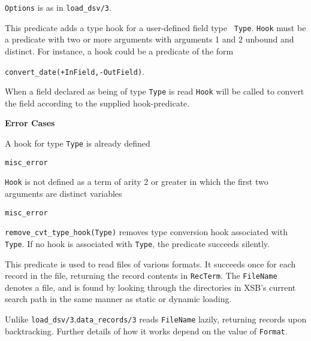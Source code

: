\begin{description}
{\tt Options} is as in {\tt load\_dsv/3}.




%
This predicate adds a type hook for a user-defined field type {\tt
  Type}.  {\tt Hook} must be a predicate with two or more arguments
with arguments 1 and 2 unbound and distinct. For instance, a hook
could be a predicate of the form

{\tt convert\_date(+InField,-OutField)}.

When a field declared as being of type {\tt Type} is read {\tt Hook}
will be called to convert the field according to the supplied
hook-predicate.

{\bf Error Cases} 
\bi
\item 	A hook for type {\tt Type} is already defined
\bi
\item    {\tt misc\_error}
\ei
\item {\tt Hook} is not defined as a term of arity 2 or greater in which the first two arguments are distinct variables \bi
\item    {\tt misc\_error}
  \ei
  \ei
  
%
{\tt remove\_cvt\_type\_hook(Type)} removes type conversion hook
associated with {\tt Type}.  If no hook is associated with {\tt Type},
the predicate succeeds silently.

This predicate is used to read files of various formats.  It succeeds
once for each record in the file, returning the record contents in
{\tt RecTerm}.  The {\tt FileName} denotes a file, and is found by
looking through the directories in XSB's current search path in the
same manner as static or dynamic loading.

Unlike {\tt load\_dsv/3},{\tt data\_records/3} reads {\tt FileName}
lazily, returning records upon backtracking.  Further details of how
it works depend on the value of {\tt Format}.


\end{description}
